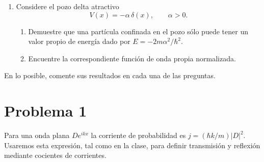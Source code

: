 \documentclass[11pt,a4paper]{article}
\numberwithin{equation}{section}
\begin{document}
\begin{enumerate}[label=\arabic*.-]
\item Considere el pozo delta atractivo
\begin{equation}
V(x)=-\alpha\,\delta(x),\qquad \alpha>0.
\end{equation}
\begin{enumerate}[label=\alph*)]
\item Demuestre que una partícula confinada en el pozo sólo puede tener un valor propio de energía dado por $E=-2m\alpha^2/\hbar^2$.
\item Encuentre la correspondiente función de onda propia normalizada.
\end{enumerate}
\end{enumerate}
En lo posible, comente sus resultados en cada una de las preguntas.


\section{Problema 1}
Para una onda plana $D e^{ikx}$ la corriente de probabilidad es $j=(\hbar k/m)|D|^2$. Usaremos esta expresión, tal como en la clase, para definir transmisión y reflexión mediante cocientes de corrientes.
\end{document}
